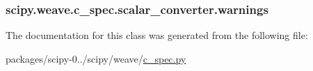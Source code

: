 \subsubsection[{warnings}]{\setlength{\rightskip}{0pt plus 5cm}scipy.\+weave.\+c\+\_\+spec.\+scalar\+\_\+converter.\+warnings}\label{classscipy_1_1weave_1_1c__spec_1_1scalar__converter_a31fc5a16a8a16e16fdd11dbae154be9e}


The documentation for this class was generated from the following file\+:\begin{DoxyCompactItemize}
\item 
packages/scipy-\/0../scipy/weave/\hyperlink{c__spec_8py}{c\+\_\+spec.\+py}\end{DoxyCompactItemize}
